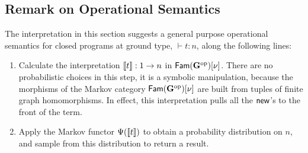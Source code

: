 \subsection{Remark on Operational Semantics}
\label{sec:abstract-op-sem}
The interpretation in this section suggests a general purpose operational semantics for closed programs at ground type,
$\vdash t:n$, along the following lines:
\begin{enumerate}
\item Calculate the interpretation $\llbracket t\rrbracket:1\to n$ in $\mathsf{Fam}(\mathbf{G}^\mathrm{op})[\nu]$. There are no probabilistic choices in this step, it is a symbolic manipulation, because the morphisms of the Markov category
  $\mathsf{Fam}(\mathbf{G}^\mathrm{op})[\nu]$ are built from tuples of finite graph homomorphisms. In effect, this interpretation pulls all the $\mathsf{new}$'s to the front of the term.
\item Apply the Markov functor $\Psi(\llbracket t\rrbracket)$ to obtain a probability distribution on $n$, and sample from this distribution to return a result.
\end{enumerate}


